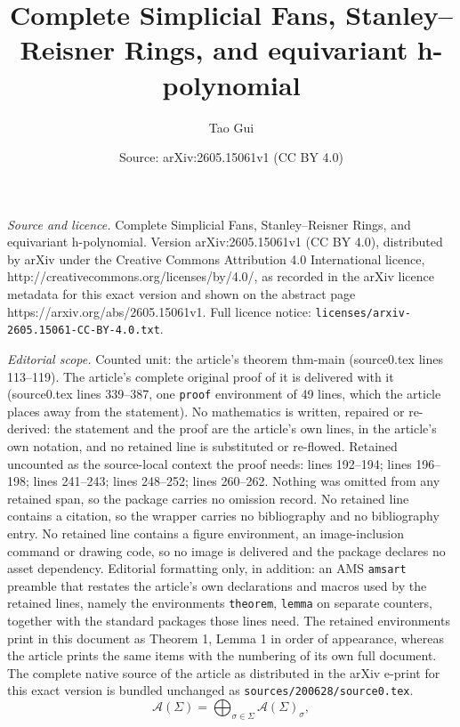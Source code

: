 \documentclass[10pt,a4paper]{amsart}
\title{Complete Simplicial Fans, Stanley--Reisner Rings, and equivariant h-polynomial}
\author{Tao Gui}
\date{Source: arXiv:2605.15061v1 (CC BY 4.0)}
\begin{document}
\maketitle

\noindent\emph{Source and licence.} Complete Simplicial Fans, Stanley--Reisner Rings, and equivariant h-polynomial. Version arXiv:2605.15061v1 (CC BY 4.0), distributed by arXiv under the Creative Commons Attribution 4.0 International licence, http://creativecommons.org/licenses/by/4.0/, as recorded in the arXiv licence metadata for this exact version and shown on the abstract page https://arxiv.org/abs/2605.15061v1. Full licence notice: \texttt{licenses/arxiv-2605.15061-CC-BY-4.0.txt}.\par\smallskip

\noindent\textit{Editorial scope.} Counted unit: the article's theorem thm-main (source0.tex lines 113--119). The article's complete original proof of it is delivered with it (source0.tex lines 339--387, one \texttt{proof} environment of 49 lines, which the article places away from the statement). No mathematics is written, repaired or re-derived: the statement and the proof are the article's own lines, in the article's own notation, and no retained line is substituted or re-flowed.  Retained uncounted as the source-local context the proof needs: lines 192--194; lines 196--198; lines 241--243; lines 248--252; lines 260--262.  Nothing was omitted from any retained span, so the package carries no omission record.  No retained line contains a citation, so the wrapper carries no bibliography and no bibliography entry.  No retained line contains a figure environment, an image-inclusion command or drawing code, so no image is delivered and the package declares no asset dependency.  Editorial formatting only, in addition: an AMS \texttt{amsart} preamble that restates the article's own declarations and macros used by the retained lines, namely the environments \texttt{theorem}, \texttt{lemma} on separate counters, together with the standard packages those lines need.  The retained environments print in this document as Theorem 1, Lemma 1 in order of appearance, whereas the article prints the same items with the numbering of its own full document.  The complete native source of the article as distributed in the arXiv e-print for this exact version is bundled unchanged as \texttt{sources/200628/source0.tex}.
\begin{equation} \label{eq-decom of SR}
   \mathcal{A}(\Sigma)=\bigoplus_{\sigma \in \Sigma} \mathcal{A}(\Sigma)_\sigma, 
\end{equation}
\end{document}

